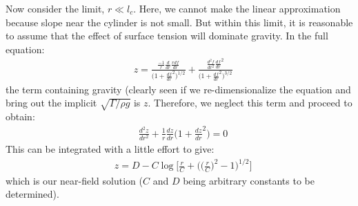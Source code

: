 \documentclass[11pt,a4paper]{article}
\newcommand{\1}{\vect{1}}
\newcommand{\RR}{\Rightarrow}
\begin{document}
Now consider the limit, $r \ll l_c$. Here, we cannot make the linear approximation because slope near the cylinder is not small. But within this limit, it is reasonable to assume that the effect of surface tension will dominate gravity. In the full equation:
\begin{align*}
&  z = \frac{\frac{-1}{r}\frac{d}{dr}\frac{rdf}{dr}}{\Big(1+\frac{df}{dr}^2\Big)^{1/2}} + \frac{\frac{d^2f}{dr^2}\frac{df}{dr}^2}{\Big(1+\frac{df}{dr}^2\Big)^{3/2}}
\end{align*}
the term containing gravity (clearly seen if we re-dimensionalize the equation and bring out the implicit $\sqrt{\Gamma/\rho g}$ is $z$. Therefore, we neglect this term and proceed to obtain:
\begin{align*}
&\frac{d^2z}{dr^2} + \frac{1}{r}\frac{dz}{dr}\Big( 1 + \frac{dz}{dr}^2\Big) = 0
\end{align*}
This can be integrated with a little effort to give:
\begin{align*}
&z = D - C \log\Big[ \frac{r}{C}+\Big(\big(\frac{r}{C}\big)^2-1\Big)^{1/2}\Big] 
\end{align*}
which is our near-field solution ($C$ and $D$ being arbitrary constants to be determined). 
\end{document}
